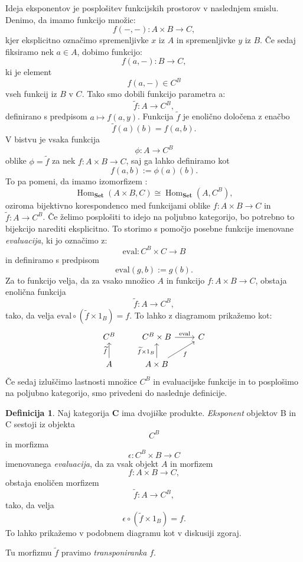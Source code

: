 \documentclass[12pt,a4paper]{book}
\theoremstyle{definition}
\newtheorem{definicija}{Definicija}[chapter]
\theoremstyle{plain}
\theoremstyle{definition}
\theoremstyle{remark}
\newcommand{\cat}[1]{\textbf{#1}}
\DeclareMathOperator{\Hom}{Hom}
\begin{document}
Ideja eksponentov je posplošitev funkcijskih prostorov v naslednjem smislu. Denimo, da imamo funkcijo množic:
$$f(-,-) : A \times B \to C,$$
kjer eksplicitno označimo spremenljivke $x$ iz $A$ in spremenljivke $y$ iz $B$. Če sedaj fiksiramo nek $a \in A$, dobimo funkcijo:
$$f(a,-): B \to C,$$
ki je element
$$f(a,-) \in C^B$$
vseh funkcij iz $B$ v $C$. Tako smo dobili funkcijo parametra a:
$$\widetilde{f} : A \to C^B,$$
definirano s predpisom $a \mapsto f(a,y)$. Funkcija $\widetilde{f}$ je enolično določena z enačbo
$$\widetilde{f}(a)(b) = f(a,b).$$
V bistvu je vsaka funkcija 
$$\phi : A \to C^B$$
oblike $\phi = \widetilde{f}$ za nek $f : A \times B \to C$, saj ga lahko definiramo kot
$$f(a,b) := \phi(a)(b).$$
To pa pomeni, da imamo izomorfizem :
$$\Hom_{\cat{Set}}(A \times B, C) \cong \Hom_{\cat{Set}}(A, C^B),$$
oziroma bijektivno korespondenco med funkcijami oblike $f : A\times B \to C$ in $\widetilde{f} : A \to C^B$. Če želimo posplošiti to idejo na poljubno kategorijo, bo potrebno to bijekcijo narediti eksplicitno. To storimo s pomočjo posebne funkcije imenovane \emph{evaluacija}, ki jo označimo z:
$$\mathrm{eval} : C^B \times C \to B$$
in definiramo s predpisom 
$$\mathrm{eval}(g,b) := g(b).$$
Za to funkcijo velja, da za vsako množico $A$ in funkcijo $f : A \times B \to C$, obstaja enolična funkcija
$$\widetilde{f} : A \to C^B,$$
tako, da velja $\mathrm{eval} \circ (\widetilde{f} \times 1_B) = f$. To lahko z diagramom prikažemo kot:
$$\begin{tikzcd}
C^B &  C^B \times B \ar[r, "\mathrm{eval}"] & C \\
A \ar[u, "\widetilde{f}"] &  A \times B \ar[u, "\widetilde{f} \times 1_B"] \ar[ur, "f"'] &
\end{tikzcd}$$
Če sedaj izluščimo lastnosti množice $C^B$ in evaluacijske funkcije in to posplošimo na poljubno kategorijo, smo privedeni do naslednje definicije.

\begin{definicija}
Naj kategorija $\cat{C}$ ima dvojiške produkte. \emph{Eksponent} objektov B in C sestoji iz objekta 
$$C^B$$
in morfizma
$$\epsilon : C^B \times B \to C$$ imenovanega \emph{evaluacija}, da za vsak objekt $A$ in morfizem 
$$f : A \times B \to C,$$
obstaja enoličen morfizem 
$$\widetilde{f} : A \to C^B,$$
tako, da velja
$$\epsilon \circ (\widetilde{f} \times 1_B) = f.$$
To lahko prikažemo v podobnem diagramu kot v diskusiji zgoraj.

Tu morfizmu $\widetilde{f}$ pravimo \emph{transponiranka} $f$.
\end{definicija}
\end{document}
